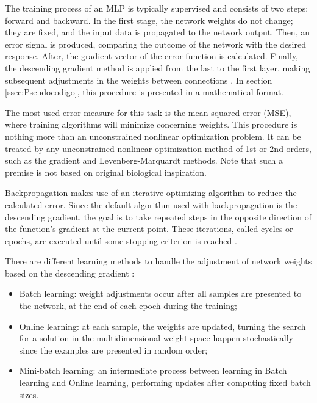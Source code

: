The training process of an MLP is typically supervised and consists of two steps: forward and backward. In the first stage, the network weights do not change; they are fixed, and the input data is propagated to the network output. Then, an error signal is produced, comparing the outcome of the network with the desired response. After, the gradient vector of the error function is calculated. Finally, the descending gradient method is applied from the last to the first layer, making subsequent adjustments in the weights between connections \cite{haykin}. In section \ref{ssec:Pseudocodigo}, this procedure is presented in a mathematical format.

The most used error measure for this task is the mean squared error (MSE), where training algorithms will minimize concerning weights. This procedure is nothing more than an unconstrained nonlinear optimization problem. It can be treated by any unconstrained nonlinear optimization method of 1st or 2nd orders, such as the gradient and Levenberg-Marquardt methods. Note that such a premise is not based on original biological inspiration.

Backpropagation makes use of an iterative optimizing algorithm to reduce the calculated error. Since the default algorithm used with backpropagation is the descending gradient, the goal is to take repeated steps in the opposite direction of the function's gradient at the current point. These iterations, called cycles or epochs, are executed until some stopping criterion is reached \cite{Castro2006FundamentalsON}.

There are different learning methods to handle the adjustment of network weights based on the descending gradient \cite{haykin, Bengio2012}:

\begin{itemize}
	\item Batch learning: weight adjustments occur after all samples are presented to the network, at the end of each epoch during the training;
	\item Online learning: at each sample, the weights are updated, turning the search for a solution in the multidimensional weight space happen stochastically since the examples are presented in random order;
	\item Mini-batch learning: an intermediate process between learning in Batch learning and Online learning, performing updates after computing fixed batch sizes.
\end{itemize}

